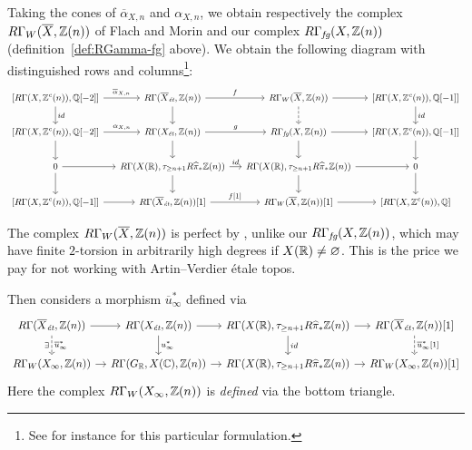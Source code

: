 \documentclass{article}
\numberwithin{equation}{section}
\begin{document}
Taking the cones of $\overline{\alpha}_{X,n}$ and $\alpha_{X,n}$, we obtain
respectively the complex $R\Gamma_W (\overline{X}, \mathbb{Z} (n))$ of Flach and Morin
\cite[Definition~3.6]{Flach-Morin-2018} and our complex
$R\Gamma_{\text{\it fg}} (X, \mathbb{Z}(n))$ (definition~\ref{def:RGamma-fg} above). We obtain the
following diagram with distinguished rows and columns\footnote{See for instance
  \cite[Proposition~1.4.6]{Neeman-2001} for this particular formulation.}:
\begin{equation}
  \label{eqn:cones-of-alphas}
  \begin{tikzcd}[column sep=1.25em,font=\small]
    {[R\Gamma (X, \ZZ^c (n)), \QQ [-2]]} \ar{r}{\overline{\alpha}_{X,n}}\ar{d}{id} & R\Gamma (\overline{X}_\et, \ZZ(n))\ar{d}\ar{r}{f} & R\Gamma_W (\overline{X}, \ZZ(n)) \ar{r}\ar[dashed]{d} & {[R\Gamma (X, \ZZ^c (n)), \QQ [-1]]}\ar{d}{id} \\
    {[R\Gamma (X, \ZZ^c (n)), \QQ [-2]]} \ar{r}{\alpha_{X,n}}\ar{d} & R\Gamma (X_\et, \ZZ(n)) \ar{r}{g}\ar{d} & R\Gamma_\fg (X, \ZZ(n)) \ar{r}\ar{d} & {[R\Gamma (X, \ZZ^c (n)), \QQ [-1]]}\ar{d} \\
    0\ar{r}\ar{d} & R\Gamma (X (\RR), \tau_{\ge n+1} R \widehat{\pi}_* \ZZ (n)) \ar{r}{id}\ar{d} & R\Gamma (X (\RR), \tau_{\ge n+1} R \widehat{\pi}_* \ZZ (n)) \ar{r}\ar{d} & 0\ar{d} \\
    {[R\Gamma (X, \ZZ^c (n)), \QQ [-1]]} \ar{r} & R\Gamma (\overline{X}_\et, \ZZ(n))[1]\ar{r}{f[1]} & R\Gamma_W (\overline{X}, \ZZ(n))[1] \ar{r} & {[R\Gamma (X, \ZZ^c (n)), \QQ]}
  \end{tikzcd}
\end{equation}

The complex $R\Gamma_W (\overline{X}, \mathbb{Z}(n))$ is perfect by
\cite[Proposition~3.8]{Flach-Morin-2018}, unlike our $R\Gamma_{\text{\it fg}} (X, \mathbb{Z}(n))$,
which may have finite $2$-torsion in arbitrarily high degrees if
$X (\mathbb{R}) \ne \varnothing$. This is the price we pay for not working with
Artin--Verdier étale topos.

Then \cite[Definition~3.23]{Flach-Morin-2018} considers a morphism
$\overline{u}^*_\infty$ defined via
\begin{equation}
  \label{eqn:definition-of-u-bar-infty}
  \begin{tikzcd}[column sep=1em]
    R\Gamma (\overline{X}_\et, \ZZ(n)) \ar{r}\ar[dashed]{d}[swap]{\exists}{\overline{u}_\infty^*} & R\Gamma (X_\et, \ZZ(n)) \ar{r}\ar{d}{u_\infty^*} & R\Gamma (X(\RR), \tau_{\ge n+1} R \widehat{\pi}_* \ZZ (n)) \ar{r}\ar{d}{id} & R\Gamma (\overline{X}_\et, \ZZ(n)) [1] \ar[dashed]{d}{\overline{u}_\infty^* [1]} \\
    R\Gamma_W (X_\infty, \ZZ (n)) \ar{r} & R\Gamma (G_\RR, X (\CC), \ZZ (n)) \ar{r} & R\Gamma (X(\RR), \tau_{\ge n+1} R \widehat{\pi}_* \ZZ (n)) \ar{r} & R\Gamma_W (X_\infty, \ZZ (n)) [1]
  \end{tikzcd}
\end{equation}
Here the complex $R\Gamma_W (X_\infty, \mathbb{Z}(n))$ is \emph{defined} via the bottom
triangle.
\end{document}
